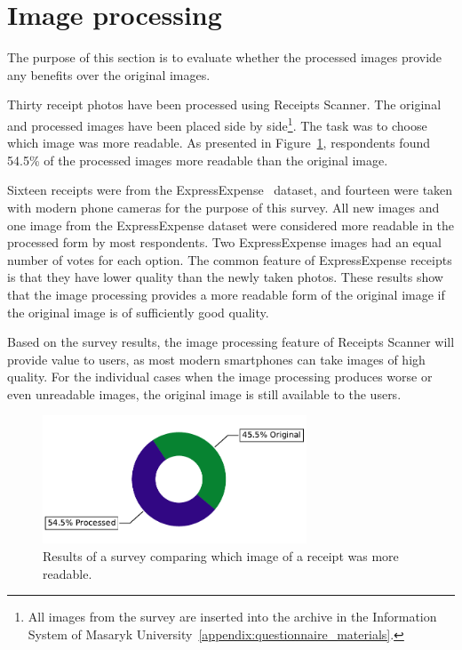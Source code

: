 \documentclass[
  digital, %
  table,   %
  oneside, %
  lof,     %
  lot,     %
]{fithesis3}
\begin{document}
\section{Image processing}
The purpose of this section is to evaluate whether the processed images provide any benefits over the original images.

Thirty receipt photos have been processed using Receipts Scanner. The original and processed images have been placed side by side\footnote{All images from the survey are inserted into the archive in the Information System of Masaryk University~\ref{appendix:questionnaire_materials}.}. The task was to choose which image was more readable. As presented in Figure~\ref{fig:which_image_is_more_readable}, respondents found 54.5\% of the processed images more readable than the original image.

Sixteen receipts were from the ExpressExpense~\cite{ExpressExpense2019Receipt} dataset, and fourteen were taken with modern phone cameras for the purpose of this survey.
All new images and one image from the ExpressExpense dataset were considered more readable in the processed form by most respondents. Two ExpressExpense images had an equal number of votes for each option. The common feature of ExpressExpense receipts is that they have lower quality than the newly taken photos. These results show that the image processing provides a more readable form of the original image if the original image is of sufficiently good quality.

Based on the survey results, the image processing feature of Receipts Scanner will provide value to users, as most modern smartphones can take images of high quality. For the individual cases when the image processing produces worse or even unreadable images, the original image is still available to the users.

\begin{figure}
    \begin{center}
        \includegraphics[width=0.7\textwidth]{figures/graphs/which_image_is_more_readable}
    \end{center}
    \caption{Results of a survey comparing which image of a receipt was more readable.}
    \label{fig:which_image_is_more_readable}
\end{figure}
\end{document}
